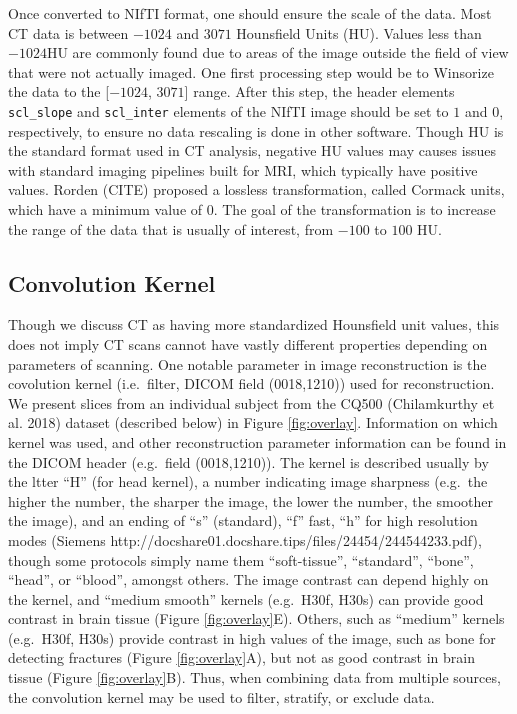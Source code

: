 \documentclass[]{elsarticle} %
\begin{document}
Once converted to NIfTI format, one should ensure the scale of the data. Most CT data is between \(-1024\) and \(3071\) Hounsfield Units (HU). Values less than \(-1024\)HU are commonly found due to areas of the image outside the field of view that were not actually imaged. One first processing step would be to Winsorize the data to the {[}\(-1024\), \(3071\){]} range. After this step, the header elements \texttt{scl\_slope} and \texttt{scl\_inter} elements of the NIfTI image should be set to \(1\) and \(0\), respectively, to ensure no data rescaling is done in other software. Though HU is the standard format used in CT analysis, negative HU values may causes issues with standard imaging pipelines built for MRI, which typically have positive values. Rorden (CITE) proposed a lossless transformation, called Cormack units, which have a minimum value of \(0\). The goal of the transformation is to increase the range of the data that is usually of interest, from \(-100\) to \(100\) HU.

\hypertarget{convolution-kernel}{%
\subsection{Convolution Kernel}\label{convolution-kernel}}

Though we discuss CT as having more standardized Hounsfield unit values, this does not imply CT scans cannot have vastly different properties depending on parameters of scanning. One notable parameter in image reconstruction is the covolution kernel (i.e.~filter, DICOM field (0018,1210)) used for reconstruction. We present slices from an individual subject from the CQ500 (Chilamkurthy et al. 2018) dataset (described below) in Figure \ref{fig:overlay}. Information on which kernel was used, and other reconstruction parameter information can be found in the DICOM header (e.g.~field (0018,1210)). The kernel is described usually by the ltter ``H'' (for head kernel), a number indicating image sharpness (e.g.~the higher the number, the sharper the image, the lower the number, the smoother the image), and an ending of ``s'' (standard), ``f'' fast, ``h'' for high resolution modes (Siemens http://docshare01.docshare.tips/files/24454/244544233.pdf), though some protocols simply name them ``soft-tissue'', ``standard'', ``bone'', ``head'', or ``blood'', amongst others. The image contrast can depend highly on the kernel, and ``medium smooth'' kernels (e.g.~H30f, H30s) can provide good contrast in brain tissue (Figure \ref{fig:overlay}E). Others, such as ``medium'' kernels (e.g.~H30f, H30s) provide contrast in high values of the image, such as bone for detecting fractures (Figure \ref{fig:overlay}A), but not as good contrast in brain tissue (Figure \ref{fig:overlay}B). Thus, when combining data from multiple sources, the convolution kernel may be used to filter, stratify, or exclude data.
\end{document}
